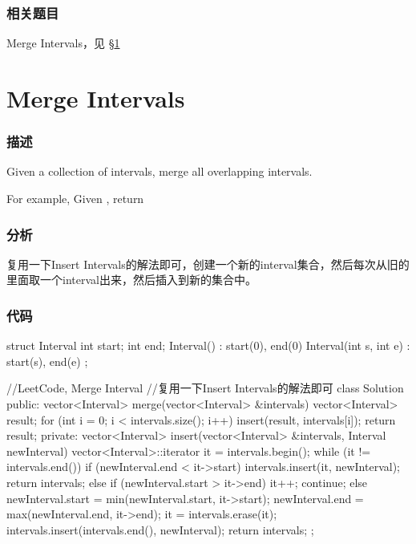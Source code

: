 \subsubsection{相关题目}

\begindot
\item Merge Intervals，见 \S \ref{sec:merge-intervals}
\myenddot


\section{Merge Intervals} %
\label{sec:merge-intervals}


\subsubsection{描述}
Given a collection of intervals, merge all overlapping intervals.

For example,
Given \code{[1,3],[2,6],[8,10],[15,18]},
return \code{[1,6],[8,10],[15,18]}


\subsubsection{分析}
复用一下Insert Intervals的解法即可，创建一个新的interval集合，然后每次从旧的里面取一个interval出来，然后插入到新的集合中。


\subsubsection{代码}
\begin{Code}
struct Interval {
    int start;
    int end;
    Interval() : start(0), end(0) { }
    Interval(int s, int e) : start(s), end(e) { }
};
 
//LeetCode, Merge Interval
//复用一下Insert Intervals的解法即可
class Solution {
public:
    vector<Interval> merge(vector<Interval> &intervals) {
        vector<Interval> result;
        for (int i = 0; i < intervals.size(); i++) {
            insert(result, intervals[i]);
        }
        return result;
    }
private:
    vector<Interval> insert(vector<Interval> &intervals, Interval newInterval) {
        vector<Interval>::iterator it = intervals.begin();
        while (it != intervals.end()) {
            if (newInterval.end < it->start) {
                intervals.insert(it, newInterval);
                return intervals;
            } else if (newInterval.start > it->end) {
                it++;
                continue;
            } else {
                newInterval.start = min(newInterval.start, it->start);
                newInterval.end = max(newInterval.end, it->end);
                it = intervals.erase(it);
            }
        }
        intervals.insert(intervals.end(), newInterval);
        return intervals;
    }
};
\end{Code}


